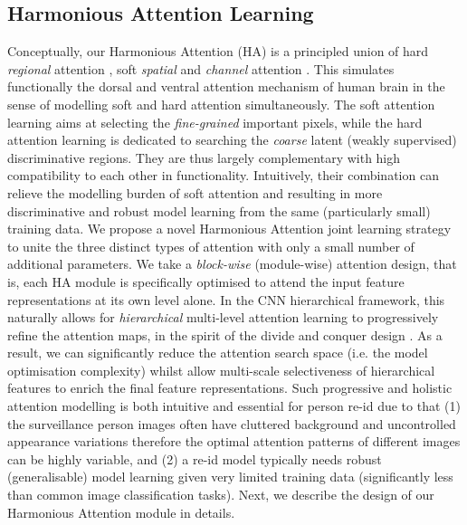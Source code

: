 \documentclass[10pt,twocolumn,letterpaper]{article}
\begin{document}
\subsection{Harmonious Attention Learning}
\label{sec:method_attention}

Conceptually, our Harmonious Attention (HA) is a principled union
of {hard} {\em regional} attention \cite{jaderberg2015spatial},
soft {\em spatial} \cite{wang2017residual} and
{\em channel} attention \cite{hu2017squeeze}.
This simulates functionally the dorsal and ventral attention mechanism of human brain \cite{vossel2014dorsal} in the sense of modelling soft and hard attention simultaneously. 
The soft attention learning aims at selecting 
the {\em fine-grained} important pixels,
while the hard attention learning is dedicated 
to searching the {\em coarse} latent ({weakly supervised}) discriminative regions.
They are thus largely complementary
with high compatibility to each other in functionality.
Intuitively, their combination can relieve the modelling burden of soft attention
and resulting in more discriminative and robust model learning
from the same (particularly small) training data. 
We propose a novel {Harmonious Attention joint learning} strategy to unite 
the three distinct types of attention with only a small number of additional parameters.
We take a {\em block-wise} (module-wise) attention design,
that is, each HA module is specifically optimised to attend
the input feature representations at its own level alone.
In the CNN hierarchical framework, this naturally allows for 
{\em hierarchical} multi-level attention learning to progressively refine the attention maps, 
in the spirit of the divide and conquer design \cite{cormen2009introduction}.
As a result, we can significantly reduce the attention search space
(i.e. the model optimisation complexity) whilst allow
multi-scale selectiveness of hierarchical features to enrich the final feature representations.
Such progressive and holistic attention modelling is both intuitive and essential for person re-id 
due to that (1) the surveillance person images often have cluttered background and uncontrolled appearance variations therefore
the optimal attention patterns of different images can be highly variable,
and (2) a re-id model typically needs robust (generalisable) model learning given very
limited training data (significantly less than common image
classification tasks).
Next, we describe the design of our Harmonious Attention module in details.
\end{document}
